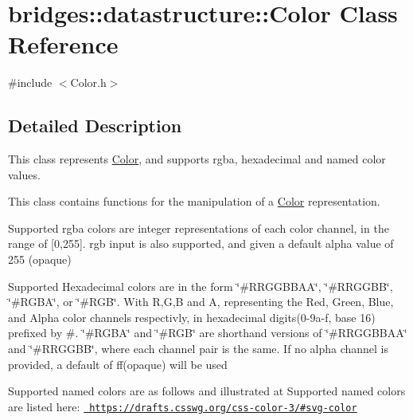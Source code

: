 \hypertarget{classbridges_1_1datastructure_1_1_color}{}\section{bridges\+::datastructure\+::Color Class Reference}
\label{classbridges_1_1datastructure_1_1_color}


{\ttfamily \#include $<$Color.\+h$>$}



\subsection{Detailed Description}
This class represents \mbox{\hyperlink{classbridges_1_1datastructure_1_1_color}{Color}}, and supports rgba, hexadecimal and named color values. 

This class contains functions for the manipulation of a \mbox{\hyperlink{classbridges_1_1datastructure_1_1_color}{Color}} representation.

Supported rgba colors are integer representations of each color channel, in the range of \mbox{[}0,255\mbox{]}. rgb input is also supported, and given a default alpha value of 255 (opaque)

Supported Hexadecimal colors are in the form \char`\"{}\#\+R\+R\+G\+G\+B\+B\+A\+A\char`\"{}, \char`\"{}\#\+R\+R\+G\+G\+B\+B\char`\"{}, \char`\"{}\#\+R\+G\+B\+A\char`\"{}, or \char`\"{}\#\+R\+G\+B\char`\"{}. With R,G,B and A, representing the Red, Green, Blue, and Alpha color channels respectivly, in hexadecimal digits(0-\/9a-\/f, base 16) prefixed by \textquotesingle{}\#\textquotesingle{}. \char`\"{}\#\+R\+G\+B\+A\char`\"{} and \char`\"{}\#\+R\+G\+B\char`\"{} are shorthand versions of \char`\"{}\#\+R\+R\+G\+G\+B\+B\+A\+A\char`\"{} and \char`\"{}\#\+R\+R\+G\+G\+B\+B\char`\"{}, where each channel pair is the same. If no alpha channel is provided, a default of \textquotesingle{}ff\textquotesingle{}(opaque) will be used

Supported named colors are as follows and illustrated at Supported named colors are listed here\+: \href{https://drafts.csswg.org/css-color-3/\#svg-color}{\texttt{ https\+://drafts.\+csswg.\+org/css-\/color-\/3/\#svg-\/color}}

